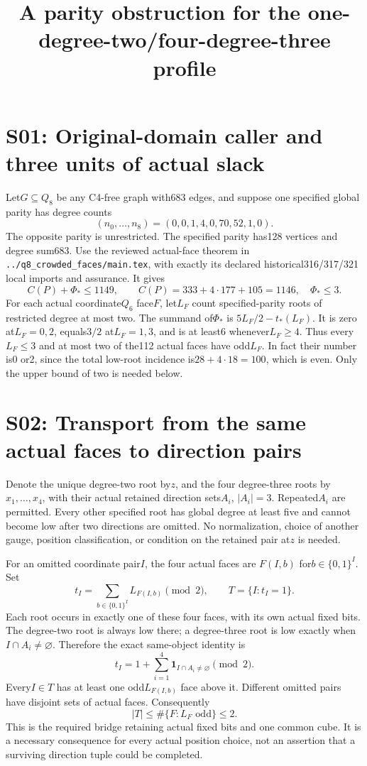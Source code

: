 \documentclass{article}
\begin{document}
\title{A parity obstruction for the one-degree-two/four-degree-three profile}
\maketitle
\section{S01: Original-domain caller and three units of actual slack}
Let$G\subseteq Q_8$ be any C4-free graph with683 edges, and suppose
one specified global parity has degree counts
\[
           (n_0,\ldots,n_8)=(0,0,1,4,0,70,52,1,0).       \tag{1}
\]
The opposite parity is unrestricted. The specified parity has128 vertices and degree sum683.
Use the reviewed actual-face theorem in
\texttt{../q8\_crowded\_faces/main.tex}, with exactly its declared
historical316/317/321 local imports and assurance. It gives
\[
 C(P)+\Phi_*\le1149,\qquad
 C(P)=333+4\cdot177+105=1146,\quad\Phi_*\le3.             \tag{2}
\]
For each actual coordinate$Q_6$ face$F$, let$L_F$ count specified-parity
roots of restricted degree at most two. The summand of$\Phi_*$ is
$5L_F/2-t_*(L_F)$. It is zero at$L_F=0,2$, equals$3/2$ at$L_F=1,3$,
and is at least6 whenever$L_F\ge4$. Thus every$L_F\le3$ and at most
two of the112 actual faces have odd$L_F$. In fact their number is0 or2,
since the total low-root incidence is$28+4\cdot18=100$, which is even.
Only the upper bound of two is needed below.

\section{S02: Transport from the same actual faces to direction pairs}
Denote the unique degree-two root by$z$, and the four degree-three roots
by$x_1,\ldots,x_4$, with their actual retained direction sets$A_i$,
$|A_i|=3$. Repeated$A_i$ are permitted. Every other specified root has
global degree at least five and cannot become low after two directions
are omitted. No normalization, choice of another gauge, position
classification, or condition on the retained pair at$z$ is needed.

For an omitted coordinate pair$I$, the four actual faces are
$F(I,b)$ for$b\in\{0,1\}^I$. Set
\[
 t_I=\sum_{b\in\{0,1\}^I}L_{F(I,b)}\pmod2,
 \qquad T=\{I:t_I=1\}.                                 \tag{3}
\]
Each root occurs in exactly one of these four faces, with its own actual
fixed bits. The degree-two root is always low there; a degree-three root
is low exactly when$I\cap A_i\ne\varnothing$. Therefore the exact
same-object identity is
\[
 t_I=1+\sum_{i=1}^4\mathbf1_{I\cap A_i\ne\varnothing}
                                  \pmod2.               \tag{4}
\]
Every$I\in T$ has at least one odd$L_{F(I,b)}$ face above it.
Different omitted pairs have disjoint sets of actual faces. Consequently
\[
        |T|\le\#\{F:L_F\text{ odd}\}\le2.               \tag{5}
\]
This is the required bridge retaining actual fixed bits and one common
cube. It is a necessary consequence for every actual position choice,
not an assertion that a surviving direction tuple could be completed.
\end{document}
